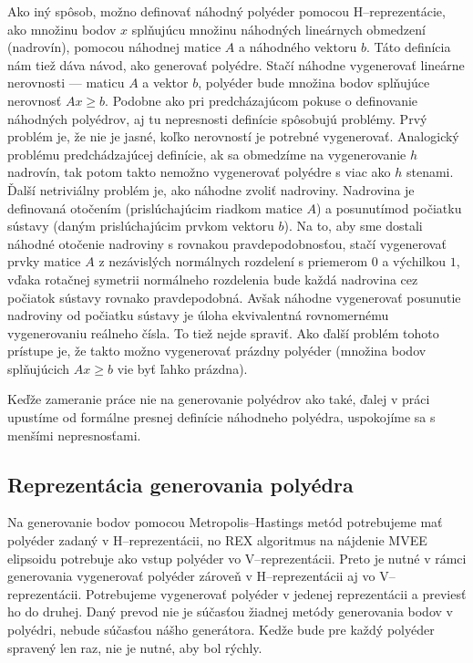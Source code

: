 Ako iný spôsob, možno definovať náhodný polyéder pomocou H--reprezentácie, ako množinu bodov $x$ splňujúcu množinu náhodných lineárnych obmedzení (nadrovín), pomocou náhodnej matice $A$ a náhodného vektoru $b$. Táto definícia nám tiež dáva návod, ako generovať polyédre. Stačí náhodne vygenerovať lineárne nerovnosti --- maticu $A$ a vektor $b$, polyéder bude množina bodov splňujúce nerovnosť $Ax\geq b$. Podobne ako pri predcházajúcom pokuse o definovanie náhodných polyédrov, aj tu nepresnosti definície spôsobujú problémy. Prvý problém je, že nie je jasné, koľko nerovností je potrebné vygenerovať. Analogický problému predchádzajúcej definície, ak sa obmedzíme na vygenerovanie $h$ nadrovín, tak potom takto nemožno vygenerovať polyédre s viac ako $h$ stenami.
Ďalší netriviálny problém je, ako náhodne zvoliť nadroviny. Nadrovina je definovaná otočením (prislúchajúcim riadkom matice $A$) a posunutímod počiatku sústavy (daným prislúchajúcim prvkom vektoru $b$). Na to, aby sme dostali náhodné otočenie nadroviny s rovnakou pravdepodobnosťou, stačí vygenerovať prvky matice $A$ z nezávislých normálnych rozdelení s priemerom $0$ a výchilkou $1$, vďaka rotačnej symetrii normálneho rozdelenia bude každá nadrovina cez počiatok sústavy rovnako pravdepodobná. Avšak náhodne vygenerovať posunutie nadroviny od počiatku sústavy je úloha ekvivalentná rovnomernému vygenerovaniu reálneho čísla. To tiež nejde spraviť. Ako ďalší problém tohoto prístupe je, že takto možno vygenerovať prázdny polyéder (množina bodov splňujúcich $Ax \geq b$ vie byť ľahko prázdna).

Keďže zameranie práce nie na generovanie polyédrov ako také, ďalej v práci upustíme od formálne presnej definície náhodneho polyédra, uspokojíme sa s menšími nepresnosťami.\\

\subsection{Reprezentácia generovania polyédra}
Na generovanie bodov pomocou Metropolis--Hastings metód potrebujeme mať polyéder zadaný v H--reprezentácii, no REX algoritmus na nájdenie MVEE elipsoidu potrebuje ako vstup polyéder vo V--reprezentácii. Preto je nutné v rámci generovania vygenerovať polyéder zároveň v H--reprezentácii aj vo V--reprezentácii. Potrebujeme vygenerovať polyéder v jedenej reprezentácii a previesť ho do druhej. Daný prevod nie je súčasťou žiadnej metódy generovania bodov v polyédri, nebude súčasťou nášho generátora. Kedže bude pre každý polyéder spravený len raz, nie je nutné, aby bol rýchly.\\

